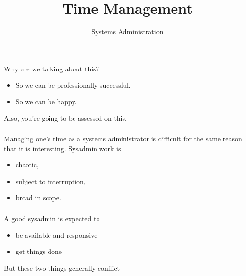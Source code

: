\documentclass[10pt]{beamer}
\title{Time Management}
\author[IN719]{Systems Administration}
\institute[Otago Polytechnic]{
  Otago Polytechnic \\
  Dunedin, New Zealand \\
}
\date{}
\begin{document}
\begin{frame}[plain]
  \titlepage
\end{frame}

\begin{frame}
  \frametitle{}

   Why are we talking about this?
      
   \begin{itemize}
     \item So we can be professionally successful.
     \item So we can be happy.
   \end{itemize}
   
   Also, you're going to be assessed on this.
   
\end{frame}



\begin{frame}
  \frametitle{}

   Managing one's time as a systems administrator is difficult for the same
   reason that it is interesting. Sysadmin work is 
   
   \begin{itemize}
     \item chaotic,
     \item subject to interruption,
     \item broad in scope.
   \end{itemize}
\end{frame}

\begin{frame}
  \frametitle{}

  A good sysadmin is expected to 
  
  \begin{itemize}
    \item be available and responsive
    \item get things done
  \end{itemize}
  
  But these two things generally conflict

\end{frame}
\end{document}

